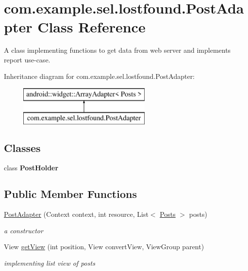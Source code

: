 \hypertarget{classcom_1_1example_1_1sel_1_1lostfound_1_1PostAdapter}{}\section{com.\+example.\+sel.\+lostfound.\+Post\+Adapter Class Reference}
\label{classcom_1_1example_1_1sel_1_1lostfound_1_1PostAdapter}


A class implementing functions to get data from web server and implements report use-\/case.  


Inheritance diagram for com.\+example.\+sel.\+lostfound.\+Post\+Adapter\+:\begin{figure}[H]
\begin{center}
\leavevmode
\includegraphics[height=2.000000cm]{classcom_1_1example_1_1sel_1_1lostfound_1_1PostAdapter}
\end{center}
\end{figure}
\subsection*{Classes}
\begin{DoxyCompactItemize}
\item 
class {\bfseries Post\+Holder}
\end{DoxyCompactItemize}
\subsection*{Public Member Functions}
\begin{DoxyCompactItemize}
\item 
\hyperlink{classcom_1_1example_1_1sel_1_1lostfound_1_1PostAdapter_a58de5e8d3132dd70bfd35dcb44bf80e1}{Post\+Adapter} (Context context, int resource, List$<$ \hyperlink{classcom_1_1example_1_1sel_1_1lostfound_1_1Posts}{Posts} $>$ posts)\hypertarget{classcom_1_1example_1_1sel_1_1lostfound_1_1PostAdapter_a58de5e8d3132dd70bfd35dcb44bf80e1}{}\label{classcom_1_1example_1_1sel_1_1lostfound_1_1PostAdapter_a58de5e8d3132dd70bfd35dcb44bf80e1}

\begin{DoxyCompactList}\small\item\em a constructor \end{DoxyCompactList}\item 
View \hyperlink{classcom_1_1example_1_1sel_1_1lostfound_1_1PostAdapter_aa2f3c1364857d97091ba325de3df6226}{get\+View} (int position, View convert\+View, View\+Group parent)
\begin{DoxyCompactList}\small\item\em implementing list view of posts \end{DoxyCompactList}\end{DoxyCompactItemize}


